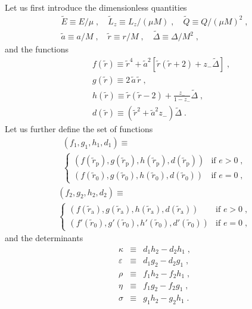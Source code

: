 \documentclass[aps,prd,twocolumn,showpacs,groupedaddress,nofootinbib]{revtex4}
\begin{document}
Let us first introduce the dimensionless quantities
\begin{gather}
\tilde{E}\equiv E/\mu\;,\quad
\tilde{L}_z\equiv L_z/(\mu M)\;,\quad\tilde{Q}\equiv Q/(\mu M)^2\;,\\ 
\tilde{a}\equiv a/M\;,\quad
\tilde{r}\equiv r/M\;,\quad \tilde{\Delta}\equiv\Delta/M^2\;,
\end{gather}
and the functions
\begin{eqnarray}
&&  f(\tilde{r}) \equiv \tilde{r}^{4} + \tilde{a}^{2}\left[\tilde{r}(\tilde{r}+2)+z_{-}\tilde{\Delta}\right]\;, \\
&&  g(\tilde{r}) \equiv 2\,\tilde{a}\,\tilde{r}\;, \\
&&  h(\tilde{r}) \equiv \tilde{r}(\tilde{r}-2) + \frac{z_{-}}{1-z_{-}}\tilde{\Delta}\;, \\
&&  d(\tilde{r}) \equiv (\tilde{r}^{2} + \tilde{a}^{2}z_{-})\tilde{\Delta}\;.
\end{eqnarray}
Let us further define the set of functions
\begin{multline}
  (f_{1}, g_{1}, h_{1}, d_{1})  \equiv\\
  \left\{\begin{array}{ll} 
    (f(\tilde{r}_{\mathrm{p}}), g(\tilde{r}_{\mathrm{p}}), 
     h(\tilde{r}_{\mathrm{p}}), d(\tilde{r}_{\mathrm{p}})) &
    \mbox{if $e>0$}\;, \\
    (f(\tilde{r}_{0}), g(\tilde{r}_{0}), h(\tilde{r}_{0}), d(\tilde{r}_{0})) &
    \mbox{if $e=0$}\;,
  \end{array}\right.
\end{multline}
\begin{multline}
  (f_{2}, g_{2}, h_{2}, d_{2}) \equiv\\
  \left\{\begin{array}{ll}
    (f(\tilde{r}_{\mathrm{a}}), g(\tilde{r}_{\mathrm{a}}), 
     h(\tilde{r}_{\mathrm{a}}), d(\tilde{r}_{\mathrm{a}})) & 
    \mbox{if $e>0$}\;, \\
    (f'(\tilde{r}_{0}), g'(\tilde{r}_{0}), h'(\tilde{r}_{0}),
     d'(\tilde{r}_{0})) & 
    \mbox{if $e=0$}\;,
  \end{array}\right.
\end{multline}
and the determinants
\begin{eqnarray}
\kappa &\equiv& d_1h_2 - d_2h_1\;,\label{kappa_def}
\\
\varepsilon &\equiv& d_1g_2 - d_2g_1\;,
\\
\rho &\equiv& f_1h_2 - f_2h_1\;,
\\
\eta &\equiv& f_1g_2 - f_2g_1\;,
\\
\sigma &\equiv& g_1h_2 - g_2h_1\;.
\end{eqnarray}
\end{document}
